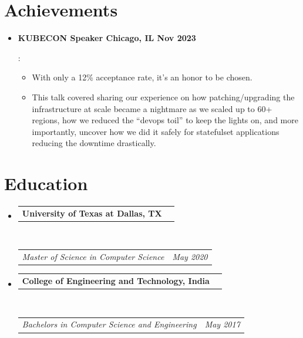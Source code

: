 \documentclass[letterpaper,11pt]{article}
\makeatletter
\newcommand{\resumeItem}[2]{
  \item\small{
    \textbf{#1}{: #2 \vspace{-4pt}}
  }
}
\newcommand{\resumeSubheading}[4]{
  \vspace{-1pt}\item
    \begin{tabular*}{0.97\textwidth}{l@{\extracolsep{\fill}}r}
      \textbf{#1} & #2
    \end{tabular*}\\
    \vspace{-2pt}
    \begin{tabular*}{0.97\textwidth}{l@{\extracolsep{\fill}}r}
    \hspace{-3pt}\textit{\small#3} & \textit{\small #4} \\
    \end{tabular*}
    \vspace{-14pt}
}
\newcommand{\resumeSubHeadingListStart}{\begin{itemize}[leftmargin=*]}
\newcommand{\resumeSubHeadingListEnd}{\end{itemize}}
\newcommand{\resumeItemListStart}{\begin{itemize}}
\newcommand{\resumeItemListEnd}{\end{itemize}\vspace{-5pt}}
\makeatother
\begin{document}
\section{Achievements}
    \resumeItemListStart
        \resumeItem{KUBECON Speaker  \textbar \space Chicago, IL  \textbar \space Nov 2023}
        {
        \begin{itemize}
        \vspace{-5pt}
        \item With only a 12\% acceptance rate, it's an honor to be chosen.
        \item This talk covered sharing our experience on how patching/upgrading the infrastructure at scale became a nightmare as we scaled up to 60+ regions, how we reduced the “devops toil” to keep the lights on, and more importantly, uncover how we did it safely for statefulset applications reducing the downtime drastically.
        \end{itemize}
        }
    \resumeItemListEnd
      
    
\section{Education}
  \resumeSubHeadingListStart
    \resumeSubheading
      {University of Texas at Dallas, TX}{}
      {Master of Science in Computer Science }{May 2020}
    \resumeSubheading
      {College of Engineering and Technology, India}{}
      {Bachelors in Computer Science and Engineering }{May 2017}
    \vspace{8pt}
  \resumeSubHeadingListEnd
\end{document}
